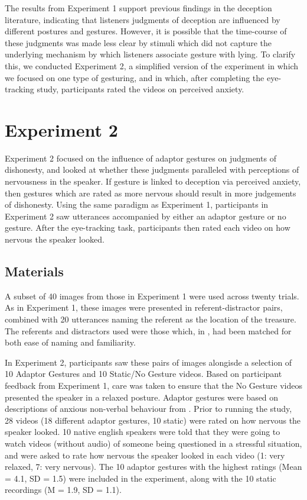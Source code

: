 \documentclass[a4paper,man,natbib]{apa6}
\begin{document}
The results from Experiment 1 support previous findings in the deception literature, indicating that listeners judgments of deception are influenced by different postures and gestures. 
However, it is possible that the time-course of these judgments was made less clear by stimuli which did not capture the underlying mechanism by which listeners associate gesture with lying.
To clarify this, we conducted Experiment 2, a simplified version of the experiment in which we focused on one type of gesturing, and in which, after completing the eye-tracking study, participants rated the videos on perceived anxiety.

\section{Experiment 2}
Experiment 2 focused on the influence of adaptor gestures on judgments of dishonesty, and looked at whether these judgments paralleled with perceptions of nervousness in the speaker.
If gesture is linked to deception via perceived anxiety, then gestures which are rated as more nervous should result in more judgements of dishonesty. 
Using the same paradigm as Experiment 1, participants in Experiment 2 saw utterances accompanied by either an adaptor gesture or no gesture.
After the eye-tracking task, participants then rated each video on how nervous the speaker looked.

\subsection{Materials}
A subset of 40 images from those in Experiment 1 were used across twenty trials.
As in Experiment 1, these images were presented in referent-distractor pairs, combined with 20 utterances naming the referent as the location of the treasure.
The referents and distractors used were those which, in \citet{Loy2017}, had been matched for both ease of naming and familiarity.

In Experiment 2, participants saw these pairs of images alongisde a selection of 10 Adaptor Gestures and 10 Static/No Gesture videos.
Based on participant feedback from Experiment 1, care was taken to ensure that the No Gesture videos presented the speaker in a relaxed posture. 
Adaptor gestures were based on descriptions of anxious non-verbal behaviour from \citet{Gregersen2005}.
Prior to running the study, 28 videos (18 different adaptor gestures, 10 static) were rated on how nervous the speaker looked.
10 native english speakers were told that they were going to watch videos (without audio) of someone being questioned in a stressful situation, and were asked to rate how nervous the speaker looked in each video (1: very relaxed, 7: very nervous). 
The 10 adaptor gestures with the highest ratings (Mean = 4.1, SD = 1.5) were included in the experiment, along with the 10 static recordings (M = 1.9, SD = 1.1).
\end{document}
